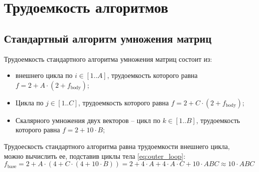 \section{Трудоемкость алгоритмов}
\subsection{Стандартный алгоритм умножения матриц}
Трудоемкость стандартного алгоритма умножения матриц состоит из:
\begin{itemize}
    \item внешнего цикла по $i \in [1..A]$, трудоемкость которого равна \\$f = 2 + A \cdot (2 + f_{\text{body}})$;
    \item Цикла по $j \in [1..C]$, трудоемкость которого равна $f = 2 + C \cdot (2 + f_{\text{body}})$;
    \item Скалярного умножения двух векторов -- цикл по $k \in [1..B]$, трудоемкость которого равна $f = 2 + 10 \cdot B$;
\end{itemize}
Трудоескость стандартного алгоритма равна трудоемкости внешнего цикла, можно вычислить ее, подставив циклы тела \ref{eq:outer_loop}:
\begin{equation}
    f_{\text{base}} = 2 + A \cdot (4 + C \cdot (4 + 10 \cdot B)) = 2 + 4 \cdot A + 4 \cdot A \cdot C + 10 \cdot ABC \approx 10 \cdot ABC
    \label{eq:outer_loop}
\end{equation}

